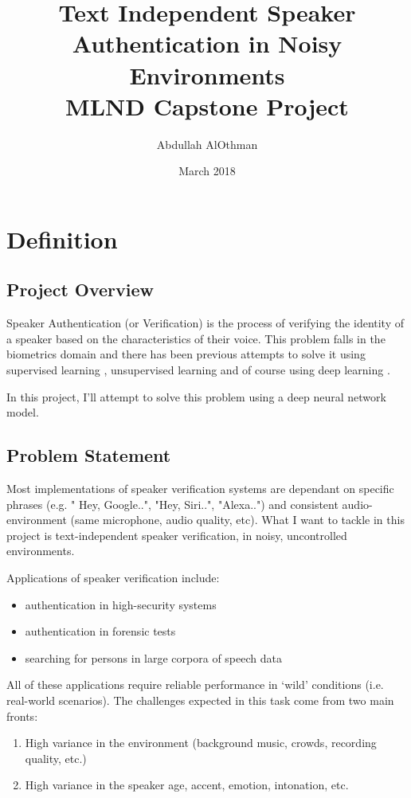 \documentclass{article}
\title{Text Independent Speaker Authentication in Noisy Environments \\
        \large MLND Capstone Project}
\author{Abdullah AlOthman}
\date{March 2018}
\begin{document}
\maketitle
\section{Definition}

\subsection{Project Overview}

Speaker Authentication (or Verification) is the process of verifying the identity of a speaker based on the characteristics of their voice. This problem falls in the biometrics domain and there has been previous attempts to solve it using supervised learning \cite{Campbell2006SupportVM}, unsupervised learning \cite{Reynolds2000SpeakerVU} and of course using deep learning \cite{Nagrani17}. 

In this project, I'll attempt to solve this problem using a deep neural network model.


\subsection{Problem Statement} \label{prblmstmt}
Most implementations of speaker verification systems are dependant on specific phrases (e.g. " Hey, Google..", "Hey, Siri..", "Alexa..") and consistent audio-environment (same microphone, audio quality, etc).
What I want to tackle in this project is text-independent speaker verification, in noisy, uncontrolled environments.

Applications of speaker verification include:
\begin{itemize}
    \item authentication in high-security systems
    \item authentication in forensic tests
    \item searching for persons in large corpora of speech data
\end{itemize}
All of these applications require reliable performance in ‘wild’ conditions (i.e. real-world scenarios). The challenges expected in this task come from two main fronts:
\begin{enumerate}
    \item High variance in the environment (background music, crowds, recording quality, etc.)
    \item High variance in the speaker age, accent, emotion, intonation, etc.
\end{enumerate}
\end{document}
